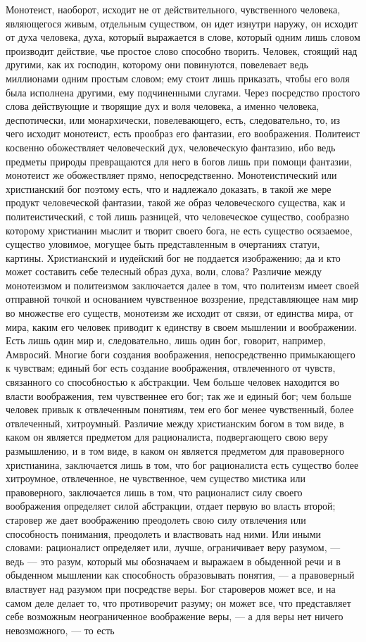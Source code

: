 \documentclass[12pt]{article}
\begin{document}
Монотеист, наоборот, исходит не от действительного, чувственного человека, являющегося живым, отдельным существом, он идет изнутри наружу, он исходит от духа человека, духа, который выражается в слове, который одним лишь словом производит действие, чье простое слово способно творить. Человек, стоящий над другими, как их господин, которому они повинуются, повелевает ведь миллионами одним простым словом; ему стоит лишь приказать, чтобы его воля была исполнена другими, ему подчиненными слугами. Через посредство простого слова действующие и творящие дух и воля человека, а именно человека, деспотически, или монархически, повелевающего, есть, следовательно, то, из чего исходит монотеист, есть прообраз его фантазии, его воображения. Политеист косвенно обожествляет человеческий дух, человеческую фантазию, ибо ведь предметы природы превращаются для него в богов лишь при помощи фантазии, монотеист же обожествляет прямо, непосредственно. Монотеистический или христианский бог поэтому есть, что и надлежало доказать, в такой же мере продукт человеческой фантазии, такой же образ человеческого существа, как и политеистический, с той лишь разницей, что человеческое существо, сообразно которому христианин мыслит и творит своего бога, не есть существо осязаемое, существо уловимое, могущее быть представленным в очертаниях статуи, картины. Христианский и иудейский бог не поддается изображению; да и кто может составить себе телесный образ духа, воли, слова? Различие между монотеизмом и политеизмом заключается далее в том, что политеизм имеет своей отправной точкой и основанием чувственное воззрение, представляющее нам мир во множестве его существ, монотеизм же исходит от связи, от единства мира, от мира, каким его человек приводит к единству в своем мышлении и воображении. Есть лишь один мир и, следовательно, лишь один бог, говорит, например, Амвросий. Многие боги создания воображения, непосредственно примыкающего к чувствам; единый бог есть создание воображения, отвлеченного от чувств, связанного со способностью к абстракции. Чем больше человек находится во власти воображения, тем чувственнее его бог; так же и единый бог; чем больше человек привык к отвлеченным понятиям, тем его бог менее чувственный, более отвлеченный, хитроумный. Различие между христианским богом в том виде, в каком он является предметом для рационалиста, подвергающего свою веру размышлению, и в том виде, в каком он является предметом для правоверного христианина, заключается лишь в том, что бог рационалиста есть существо более хитроумное, отвлеченное, не чувственное, чем существо мистика или правоверного, заключается лишь в том, что рационалист силу своего воображения определяет силой абстракции, отдает первую во власть второй; старовер же дает воображению преодолеть свою силу отвлечения или способность понимания, преодолеть и властвовать над ними. Или иными словами: рационалист определяет или, лучше, ограничивает веру разумом, --- ведь --- это разум, который мы обозначаем и выражаем в обыденной речи и в обыденном мышлении как способность образовывать понятия, --- а правоверный властвует над разумом при посредстве веры. Бог староверов может все, и на самом деле делает то, что противоречит разуму; он может все, что представляет себе возможным неограниченное воображение веры, --- а для веры нет ничего невозможного, --- то есть 
\end{document}
